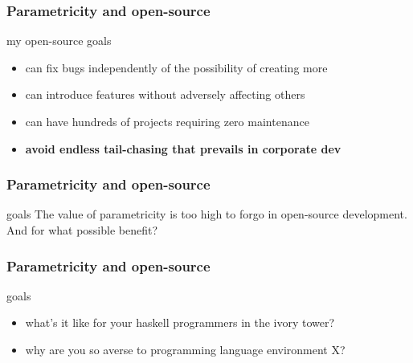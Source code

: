 \begin{frame}[fragile]
\frametitle{Parametricity and open-source}
\begin{block}{my open-source goals}
\begin{itemize}
  \item can fix bugs independently of the possibility of creating more
  \item can introduce features without adversely affecting others
  \item can have hundreds of projects requiring zero maintenance
  \item \textbf{avoid endless tail-chasing that prevails in corporate dev}
\end{itemize}
\end{block}
\end{frame}

\begin{frame}[fragile]
\frametitle{Parametricity and open-source}
\begin{block}{goals}
The value of parametricity is too high to forgo in open-source development. And for what possible benefit?
\end{block}
\end{frame}

\begin{frame}[fragile]
\frametitle{Parametricity and open-source}
\begin{block}{goals}
\begin{itemize}
  \item what's it like for your haskell programmers in the ivory tower?
  \item why are you so averse to programming language environment X?
\end{itemize}
\end{block}
\end{frame}
